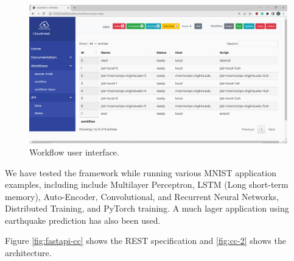 \documentclass[utf8]{FrontiersinVancouver} %
\begin{document}
\begin{figure}[htb]
    \centering
    \includegraphics[width=0.70\columnwidth]{images/cc-1.png}
    \caption{Workflow user interface. }
    \label{fig:cc-3}
\end{figure}


We have tested the framework while running various MNIST application
examples, including include Multilayer Perceptron, LSTM (Long
short-term memory), Auto-Encoder, Convolutional, and Recurrent Neural
Networks, Distributed Training, and PyTorch training.  A much lager
application using earthquake prediction has also been used.

Figure \ref{fig:fastapi-cc} shows the REST specification and
\ref{fig:cc-2} shows the architecture.


\end{document}

